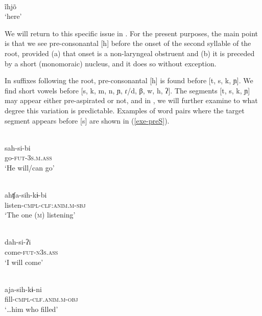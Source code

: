\documentclass[output=paper]{langscibook}
\begin{document}
\begin{exe}
\ex\label{exe-desc-ihno}
\gll [ĩh̃.ɲõ]\\
ĩhjõ\\
\trans `here'\\
{\citep[20120912elicr007]{Bruil:2012}}
\end{exe}

We will return to this specific issue in . For the present purposes, the main point is that we see pre-consonantal [h] before the onset of the second syllable of the root, provided (a) that onset is a non-laryngeal obstruent and (b) it is preceded by a short (monomoraic) nucleus, and it does so without exception.

In suffixes following the root, pre-consonantal [h] is found before [t, s, k, ɲ]. We find short vowels before [s, k, m, n, ɲ, ɾ/d, β, w, h, ʔ]. The segments [t, s, k, ɲ] may appear either pre-aspirated or not, and in , we will further examine to what degree this variation is predictable. Examples of word pairs where the target segment appears before [s] are shown in (\ref{exe-preS}).

\begin{exe}
\ex\label{exe-preS}
\begin{xlist}
\ex
\ea
\glll [sah.si.βi]\\
sah-si-bi\\
go-\textsc{fut-3s.m.ass}\\
\trans `He will/can go'\\
{\citep[197]{Bruil:2014}}

\ex \glll [ah.ʧa.sih.kɨ.βi]\\
ahʧa-sih-kɨ-bi\\
listen-\textsc{cmpl-clf:anim.m-sbj}\\
\trans `The one (\textsc{m}) listening'\\
{\citep[20140615swicr001.355]{Bruil:2012}}
\z

\ex
\ea
\glll [t̰ah.si.ʔi]\\
dah-si-ʔi\\
come-\textsc{fut-n3s.ass}\\
\trans `I will come'\\
{\citep[20110328slicr002.015]{Bruil:2012}}

\ex
{}\\
aja-sih-kɨ-ni\\
fill-\textsc{cmpl-clf.anim.m-obj}\\
\trans `\ldots him who filled'\\
{\citep[20150720selyi002.027]{Bruil:2012}}
\z
\end{xlist}
\end{exe}
\end{document}
